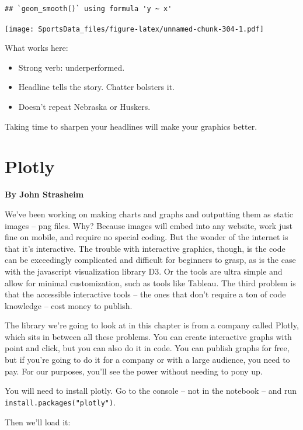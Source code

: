 \documentclass[
]{book}
\providecommand{\tightlist}{%
  \setlength{\itemsep}{0pt}\setlength{\parskip}{0pt}}
\begin{document}
\begin{verbatim}
## `geom_smooth()` using formula 'y ~ x'
\end{verbatim}

\texttt{[image: SportsData\_files/figure-latex/unnamed-chunk-304-1.pdf]}

What works here:

\begin{itemize}
\tightlist
\item
  Strong verb: underperformed.
\item
  Headline tells the story. Chatter bolsters it.
\item
  Doesn't repeat Nebraska or Huskers.
\end{itemize}

Taking time to sharpen your headlines will make your graphics better.

\hypertarget{plotly}{%
\chapter{Plotly}\label{plotly}}

\textbf{By John Strasheim}

We've been working on making charts and graphs and outputting them as static images -- png files. Why? Because images will embed into any website, work just fine on mobile, and require no special coding. But the wonder of the internet is that it's interactive. The trouble with interactive graphics, though, is the code can be exceedingly complicated and difficult for beginners to grasp, as is the case with the javascript visualization library D3. Or the tools are ultra simple and allow for minimal customization, such as tools like Tableau. The third problem is that the accessible interactive tools -- the ones that don't require a ton of code knowledge -- cost money to publish.

The library we're going to look at in this chapter is from a company called Plotly, which sits in between all these problems. You can create interactive graphs with point and click, but you can also do it in code. You can publish graphs for free, but if you're going to do it for a company or with a large audience, you need to pay. For our purposes, you'll see the power without needing to pony up.

You will need to install plotly. Go to the console -- not in the notebook -- and run \texttt{install.packages("plotly")}.

Then we'll load it:
\end{document}
